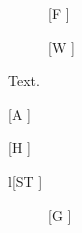 \documentclass{article}
\begin{document}
{\small
\begin{figure}{[F \the\baselineskip]}\end{figure}
\begin{figure}\small{}\end{figure}
\begin{figure}{[W \the\baselineskip]}\end{figure} Text.
\begin{algorithm}[h]{[A \the\baselineskip]}\;\caption{y}\end{algorithm}
\begin{algorithm}[H]{[H \the\baselineskip]}\;\caption{x}\end{algorithm}
\makeatletter\begin{supertabular}{l}[ST \f@size]\\\end{supertabular}
\begin{figure}{[G \the\baselineskip]}\end{figure}
}
\end{document}
